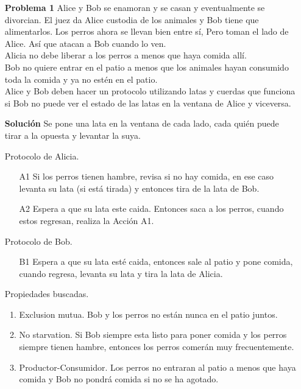\documentclass{article}
\begin{document}
\begin{enumerate}

\item[\bf{Problema 1}] Alice y Bob se enamoran y se casan y eventualmente se divorcian.
El juez da Alice custodia de los animales y Bob tiene que alimentarlos. 
Los perros ahora se llevan bien entre sí, Pero toman el lado de Alice.
Así que atacan a Bob cuando lo ven.\\
Alicia no debe liberar a los perros a menos que haya comida allí.\\
Bob no quiere entrar en el patio a menos que los animales hayan consumido toda la comida y ya no estén en el patio.\\

Alice y Bob deben hacer un protocolo utilizando latas y cuerdas que funciona si Bob no puede ver el estado de las latas en la ventana de Alice y viceversa.\\

\item[\bf{Solución}]
Se pone una lata en la ventana de cada lado, cada quién puede tirar a la opuesta y levantar la suya.

Protocolo de Alicia.\\
\begin{enumerate}
\item[A1] Si los perros tienen hambre, revisa si no hay comida, en ese caso levanta su lata (si está tirada) y entonces tira de la lata de Bob.
\item[A2] Espera a que su lata este caida. Entonces saca a los perros, cuando estos regresan, realiza la Acción A1.
\end{enumerate}

Protocolo de Bob.\\
\begin{enumerate}
\item[B1] Espera a que su lata esté caida, entonces sale al patio y pone comida, cuando regresa,  levanta su lata y tira la lata de Alicia.
\end{enumerate}

Propiedades buscadas.
\begin{enumerate}
\item{Exclusion mutua}. Bob y los perros no están nunca en el patio juntos.
\item{No starvation}. Si Bob siempre esta listo para poner comida y los perros siempre tienen hambre, entonces los perros comerán muy frecuentemente.
\item{Productor-Consumidor}. Los perros no entraran al patio a menos que haya comida y Bob no pondrá comida si no se ha agotado.
\end{enumerate}


\end{enumerate}
\end{document}
